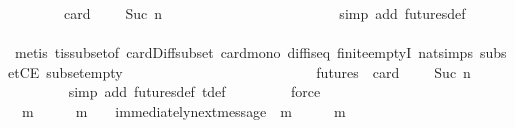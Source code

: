 \begin{isabellebody}
\ \ \ \ \ \ \ \ {\isachardoublequoteopen}card\ {\isacharparenleft}{\isasymsigma}{\isacharprime}\ {\isacharminus}\ {\isasymsigma}{\isacharparenright}\ {\isacharequal}\ Suc\ n{\isachardoublequoteclose}\ \isanewline
\ \ \ \ \ \isamarkupfalse%
\ \isamarkupfalse%
\ {\isachardoublequoteopen}{\isasymsigma}{\isacharprime}\ {\isasymin}\ {\isasymSigma}\ {\isasymand}\ {\isasymsigma}{\isacharprime}\ {\isasymnoteq}\ {\isasymemptyset}{\isachardoublequoteclose}\isanewline
\ \ \ \ \ \ \ \isamarkupfalse%
\ {\isacharparenleft}simp\ add{\isacharcolon}\ futures{\isacharunderscore}def{\isacharparenright}\isanewline
\ \ \ \ \ \ \ \isamarkupfalse%
\ {\isacharparenleft}metis\ {\isasymSigma}t{\isacharunderscore}is{\isacharunderscore}subset{\isacharunderscore}of{\isacharunderscore}{\isasymSigma}\ card{\isacharunderscore}Diff{\isacharunderscore}subset\ card{\isacharunderscore}mono\ diff{\isacharunderscore}is{\isacharunderscore}{}{\isacharunderscore}eq{\isacharprime}\ finite{\isachardot}emptyI\ nat{\isachardot}simps{\isacharparenleft}{}{\isacharparenright}\ subsetCE\ subset{\isacharunderscore}empty{\isacharparenright}\ \ \ \ \ \ \ \isanewline
\ \ \ \ \ \isamarkupfalse%
\ {\isachardoublequoteopen}{\isasymsigma}\ {\isasymsubset}\ {\isasymsigma}{\isacharprime}{\isachardoublequoteclose}\isanewline
\ \ \ \ \ \ \ \isamarkupfalse%
\ {\isacartoucheopen}{\isasymsigma}{\isacharprime}\ {\isasymin}\ futures\ {\isasymsigma}{\isacartoucheclose}\ {\isacartoucheopen}card\ {\isacharparenleft}{\isasymsigma}{\isacharprime}\ {\isacharminus}\ {\isasymsigma}{\isacharparenright}\ {\isacharequal}\ Suc\ n{\isacartoucheclose}\ \isanewline
\ \ \ \ \ \ \ \isamarkupfalse%
\ {\isacharparenleft}simp\ add{\isacharcolon}\ futures{\isacharunderscore}def\ {\isasymSigma}t{\isacharunderscore}def{\isacharparenright}\isanewline
\ \ \ \ \ \ \ \isamarkupfalse%
\ force\ \isanewline
\ \ \ \ \ \isamarkupfalse%
\ \isamarkupfalse%
\ {\isachardoublequoteopen}{\isasymexists}\ m\ {\isasymsigma}{\isacharprime}{\isacharprime}{\isachardot}\ {\isasymsigma}{\isacharprime}{\isacharprime}\ {\isasymin}\ {\isasymSigma}\ {\isasymand}\ m\ {\isasymin}\ {\isasymsigma}{\isacharprime}\ {\isasymand}\ immediately{\isacharunderscore}next{\isacharunderscore}message\ {\isacharparenleft}{\isasymsigma}{\isacharprime}{\isacharprime}{\isacharcomma}\ m{\isacharparenright}\ {\isasymand}\ {\isasymsigma}{\isacharprime}\ {\isacharequal}\ {\isasymsigma}{\isacharprime}{\isacharprime}\ {\isasymunion}\ {\isacharbraceleft}m{\isacharbraceright}\ {\isasymand}\ {\isasymsigma}\ {\isasymsubseteq}\ {\isasymsigma}{\isacharprime}{\isacharprime}{\isachardoublequoteclose}\isanewline

\end{isabellebody}
